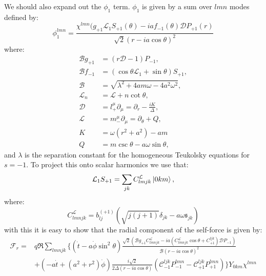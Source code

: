 \documentclass[preprint,showpacs,preprintnumbers,amssymb,superscriptaddress,aps,prd,nofootinbib,11pt]{revtex4-1}
\begin{document}
We should also expand out the $\phi_1$ term. $\phi_1$ is given by a sum over $lmn$ modes defined by:
\begin{equation}
    \phi_1^{lmn} = \frac{\chi^{lmn}(g_{+1} \mathcal{L}_1 S_{+1}(\theta) - ia f_{-1}(\theta) \mathcal{D}P_{+1}(r)}{\sqrt{2} (r-ia\cos\theta)^2}
\end{equation}
where:
\begin{align}
    \mathcal{B} g_{+1} &= (r\mathcal{D}-1)P_{-1},\\
    \mathcal{B} f_{-1} &= (\cos \theta \mathcal{L}_1 + \sin\theta) S_{+1},\\
    \mathcal{B} &= \sqrt{\lambda^2 + 4 am \omega - 4 a^2 \omega^2},\\
    \mathcal{L}_n &= \mathcal{L} + n \cot\theta,\\
    \mathcal{D} &= l^\mu_+ \partial_\mu = \partial_r - \frac{iK}{\Delta},\\
    \mathcal{L} &= m^\mu_- \partial_\mu = \partial_\theta + Q,\\
    K&=\omega(r^2 +a^2) -am\\
    Q&=m \csc \theta -a \omega \sin \theta,
\end{align}
and $\lambda$ is the separation constant for the homogeneous Teukolsky equations for $s=-1$. To project this onto scalar harmonics we use that\cite{TorresDolan2022}:
\begin{equation}
    \mathcal{L}_1 S_{+1} = \sum\limits_{jk} C^\mathcal{L}_{lmjk} \ket{0km},
\end{equation}
where:
\begin{equation}
    C^\mathcal{L}_{lmnjk} = b_{lj}^{(+1)}\left(\sqrt{j(j+1)} \delta_{jk} - a \omega \mathfrak{s}_{jk}\right)
\end{equation}
with this it is easy to show that the radial component of the self-force is given by:
\begin{align}
    \mathcal{F}_r =& q\Re\sum\limits_{lmnjk}\Bigg\{(\dot{t}- a\dot{\phi} \sin^2\theta) \frac{\sqrt{2} \left(\mathcal{B} g_{+1} C^\mathcal{L}_{lmnjk} - ia \left(C^\mathcal{L}_{lmnjk} \cos\theta + C^{ljk}_{+1}\right)\mathcal{D} P_{-1}\right)}{\mathcal{B} (r-ia\cos\theta)^2} \nonumber\\
    &+ \left(-a \dot{t} + (a^2 +r^2)\dot{\phi} \right)\frac{i\sqrt{2} }{2 \Delta(r-ia \cos \theta) } \left(\mathcal{C}^{ljk}_{-1} P^{lmn}_{-1}  - \mathcal{C}^{ljk}_{+1} P^{lmn}_{+1} \right) \Bigg\}Y_{0km}\chi^{lmn}
\end{align}
\end{document}
